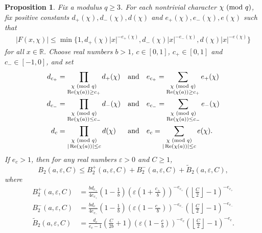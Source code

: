 \documentclass[11pt]{article}
\theoremstyle{plain}
\newtheorem{prop}[thm]{Proposition}
\theoremstyle{definition}
\numberwithin{equation}{section}
\renewcommand{\mod}[1]{{\ifmmode\text{\rm\ (mod~$#1$)}\else\discretionary{}{}{\hbox{\!\!}}\rm(mod~$#1$)\fi}}
\renewcommand{\Re}{\mathop{\rm Re}}
\newcommand{\R}{\mathbb R}
\newcommand{\0}{{\vec 0}}
\begin{document}
\begin{prop}\label{proposition bound 2}
Fix a modulus $q\ge3$. For each nontrivial character $\chi\mod q$, fix positive constants $d_+(\chi),d_-(\chi),d(\chi)$ and $e_+(\chi),e_-(\chi),e(\chi)$ such that
\begin{align} \label{F bound polynomial}
|F(x,\chi)|\le \min\{ 1, d_+(\chi)|x|^{-e_+(\chi)}, d_-(\chi)|x|^{-e_-(\chi)}, d(\chi)|x|^{-e(\chi)} \}
\end{align}
for all $x\in\R$.
Choose real numbers $b>1$, $c\in[0,1]$, $c_+\in[0,1]$ and $c_-\in[-1,0]$, and set
\[
\begin{alignedat}{2}
d_{c_+} &= \prod_{\substack{\chi \mod{q}\\ \Re(\chi(a))\ge c_+}} d_+(\chi) &\quad\text{and}\quad& e_{c_+} = \sum_{\substack{\chi \mod{q}\\ \Re(\chi(a))\ge c_+}}e_+(\chi) \\
d_{c_-} &= \prod_{\substack{\chi \mod{q}\\ \Re(\chi(a))\le c_-}} d_-(\chi) &\quad\text{and}\quad& e_{c_-} = \sum_{\substack{\chi \mod{q}\\ \Re(\chi(a))\le c_-}} e_-(\chi) \\
d_c &= \prod_{\substack{\chi \mod{q}\\ |\Re(\chi(a))|\le c}} d(\chi) &\quad\text{and}\quad& e_c = \sum_{\substack{\chi \mod{q}\\ |\Re(\chi(a))|\le c}} e(\chi).
\end{alignedat}
\]
If $e_c>1$, then for any real numbers $\varepsilon>0$ and $C\ge1$,
\begin{equation} \label{triple threat}
B_2(a,\varepsilon,C)\le B_2^+(a,\varepsilon,C)+B_2^-(a,\varepsilon,C)+\widetilde{B}_2(a,\varepsilon,C),
\end{equation}
where
\begin{align*}
B_2^+(a,\varepsilon,C) &= \frac{bd_{c_+}}{4e_{c_+}}\left(1-\frac1{b}\right)\left(\varepsilon\left(1 +\frac{c_+}{b}\right)\right)^{-e_{c_+}}\left(\left\lfloor\frac{C}{2}\right\rfloor-1\right)^{-e_{c_+}} \\
B_2^-(a,\varepsilon,C) &= \frac{bd_{c_-}}{4e_{c_-}}\left(1-\frac1{b}\right)\left(\varepsilon\left(1 -\frac{c_-}{b}\right)\right)^{-e_{c_-}}\left(\left\lfloor\frac{C}{2}\right\rfloor-1\right)^{-e_{c_-}} \\
\widetilde{B}_2(a,\varepsilon,C) &= \frac{d_c}{e_c-1}\left(\frac C{2b}+1 \right) \left(\varepsilon\left(1-\frac{c}{b}\right)\right)^{-e_c}\left(\left\lfloor\frac{C}{2}\right\rfloor-1\right)^{-e_c}.
\end{align*}
\end{prop}
\end{document}
